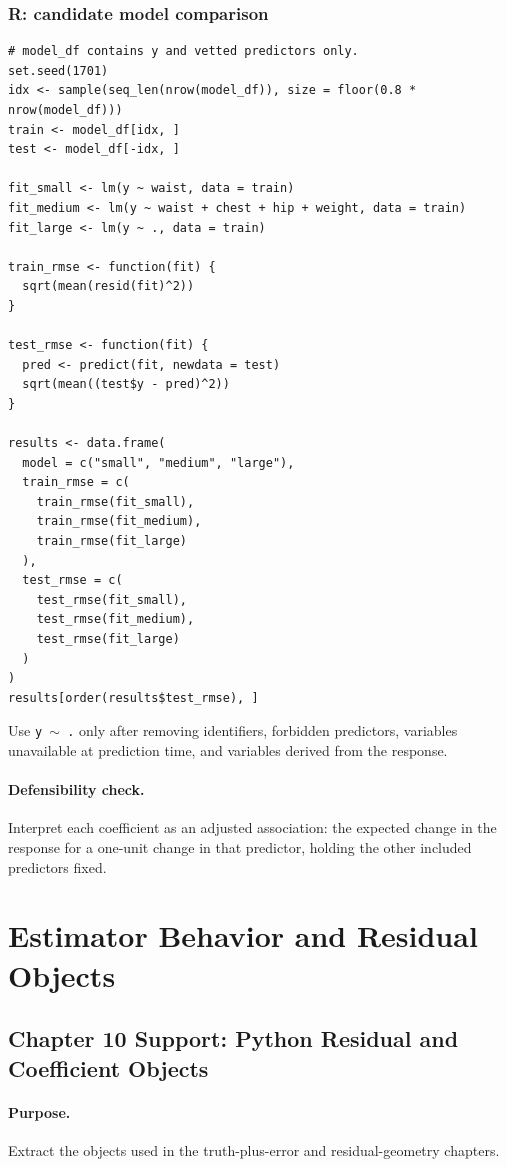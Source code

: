 \subsubsection*{R: candidate model comparison}

\begin{verbatim}
# model_df contains y and vetted predictors only.
set.seed(1701)
idx <- sample(seq_len(nrow(model_df)), size = floor(0.8 * nrow(model_df)))
train <- model_df[idx, ]
test <- model_df[-idx, ]

fit_small <- lm(y ~ waist, data = train)
fit_medium <- lm(y ~ waist + chest + hip + weight, data = train)
fit_large <- lm(y ~ ., data = train)

train_rmse <- function(fit) {
  sqrt(mean(resid(fit)^2))
}

test_rmse <- function(fit) {
  pred <- predict(fit, newdata = test)
  sqrt(mean((test$y - pred)^2))
}

results <- data.frame(
  model = c("small", "medium", "large"),
  train_rmse = c(
    train_rmse(fit_small),
    train_rmse(fit_medium),
    train_rmse(fit_large)
  ),
  test_rmse = c(
    test_rmse(fit_small),
    test_rmse(fit_medium),
    test_rmse(fit_large)
  )
)
results[order(results$test_rmse), ]
\end{verbatim}

Use \texttt{y \(\sim\) .} only after removing identifiers, forbidden predictors, variables unavailable at prediction time, and variables derived from the response.

\paragraph{Defensibility check.} Interpret each coefficient as an adjusted association: the expected change in the response for a one-unit change in that predictor, holding the other included predictors fixed.

\section{Estimator Behavior and Residual Objects}
\label{app:cookbook-estimator-residual-objects}

\subsection{Chapter 10 Support: Python Residual and Coefficient Objects}
\label{app:ch10-python-software-cookbook}

\paragraph{Purpose.} Extract the objects used in the truth-plus-error and residual-geometry chapters.

